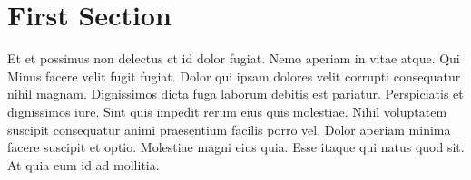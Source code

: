 \documentclass{article}
\begin{document}
	\section{First Section}
		Et et possimus non delectus et id dolor fugiat. Nemo aperiam in
		vitae atque.  Qui  Minus facere velit fugit fugiat.
		Dolor qui ipsam dolores velit corrupti consequatur nihil
		magnam.   Dignissimos
		dicta fuga laborum debitis est pariatur.  Perspiciatis et
		dignissimos iure. Sint quis impedit rerum eius quis molestiae.
		Nihil voluptatem suscipit consequatur animi praesentium facilis
		porro vel. Dolor aperiam minima facere suscipit et optio.
		Molestiae magni eius quia. Esse itaque qui natus quod sit. At
		quia eum id ad mollitia.
\end{document}
